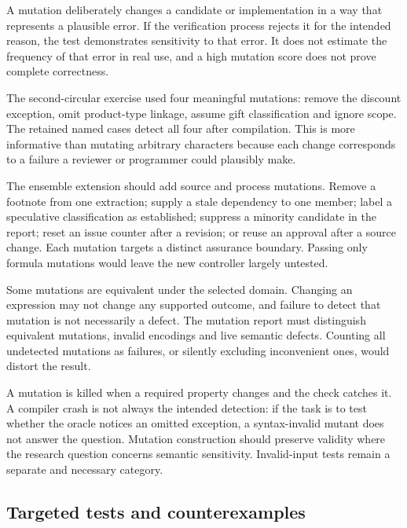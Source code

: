 A mutation deliberately changes a candidate or implementation in a way that
represents a plausible error. If the verification process rejects it for the
intended reason, the test demonstrates sensitivity to that error. It does not
estimate the frequency of that error in real use, and a high mutation score does
not prove complete correctness.

The second-circular exercise used four meaningful mutations: remove the discount
exception, omit product-type linkage, assume gift classification and ignore scope.
The retained named cases detect all four after compilation. This is more
informative than mutating arbitrary characters because each change corresponds
to a failure a reviewer or programmer could plausibly make.


The ensemble extension should add source and process mutations. Remove a footnote
from one extraction; supply a stale dependency to one member; label a speculative
classification as established; suppress a minority candidate in the report; reset
an issue counter after a revision; or reuse an approval after a source change.
Each mutation targets a distinct assurance boundary. Passing only formula
mutations would leave the new controller largely untested.

Some mutations are equivalent under the selected domain. Changing an expression
may not change any supported outcome, and failure to detect that mutation is not
necessarily a defect. The mutation report must distinguish equivalent mutations,
invalid encodings and live semantic defects. Counting all undetected mutations as
failures, or silently excluding inconvenient ones, would distort the result.

A mutation is killed when a required property changes and the check catches it.
A compiler crash is not always the intended detection: if the task is to test
whether the oracle notices an omitted exception, a syntax-invalid mutant does not
answer the question. Mutation construction should preserve validity where the
research question concerns semantic sensitivity. Invalid-input tests remain a
separate and necessary category.

\subsection{Targeted tests and counterexamples}
\label{merge:P-04-prototype:05}


